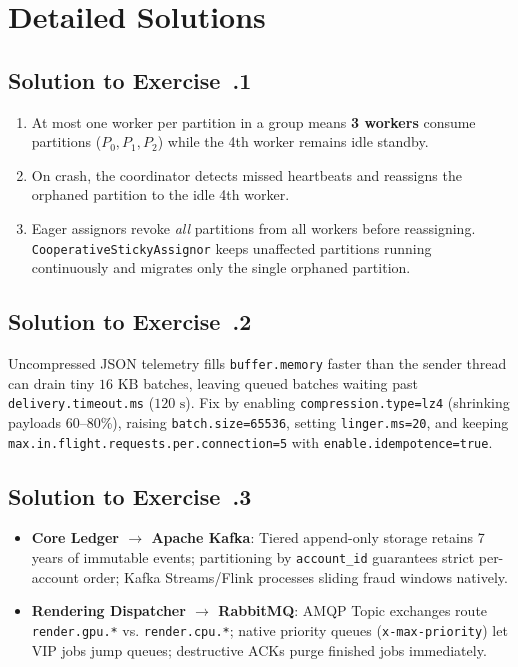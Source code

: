 \section{Detailed Solutions}

\subsection*{Solution to Exercise~\thechapter.1}
\begin{enumerate}[leftmargin=18pt]
  \item At most one worker per partition in a group means \textbf{3 workers} consume partitions ($P_0, P_1, P_2$) while the 4th worker remains idle standby.
  \item On crash, the coordinator detects missed heartbeats and reassigns the orphaned partition to the idle 4th worker.
  \item Eager assignors revoke \emph{all} partitions from all workers before reassigning. \texttt{CooperativeStickyAssignor} keeps unaffected partitions running continuously and migrates only the single orphaned partition.
\end{enumerate}

\subsection*{Solution to Exercise~\thechapter.2}
Uncompressed JSON telemetry fills \texttt{buffer.memory} faster than the sender thread can drain tiny $16\text{ KB}$ batches, leaving queued batches waiting past \texttt{delivery.timeout.ms} ($120\text{ s}$). Fix by enabling \texttt{compression.type=lz4} (shrinking payloads 60--80\%), raising \texttt{batch.size=65536}, setting \texttt{linger.ms=20}, and keeping \texttt{max.in.flight.requests.per.connection=5} with \texttt{enable.idempotence=true}.

\subsection*{Solution to Exercise~\thechapter.3}
\begin{itemize}[leftmargin=18pt]
  \item \textbf{Core Ledger $\to$ Apache Kafka}: Tiered append-only storage retains 7 years of immutable events; partitioning by \texttt{account\_id} guarantees strict per-account order; Kafka Streams/Flink processes sliding fraud windows natively.
  \item \textbf{Rendering Dispatcher $\to$ RabbitMQ}: AMQP Topic exchanges route \texttt{render.gpu.*} vs. \texttt{render.cpu.*}; native priority queues (\texttt{x-max-priority}) let VIP jobs jump queues; destructive ACKs purge finished jobs immediately.
\end{itemize}

